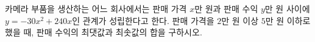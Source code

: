 카메라 부품을 생산하는 어느 회사에서는 판매 가격 $x$만 원과 판매 수익 $y$만 원 사이에 $y=-30x^2+240x$인 관계가 성립한다고 한다. 판매 가격을 $2$만 원 이상 $5$만 원 이하로 했을 때, 판매 수익의 최댓값과 최솟값의 합을 구하시오.
